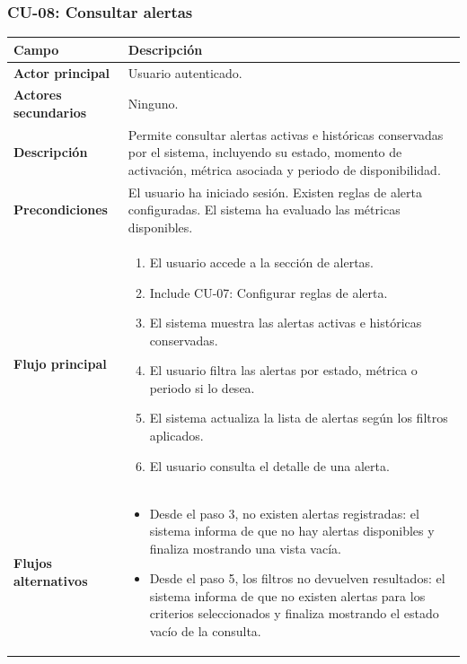 \clearpage
\subsubsection{CU-08: Consultar alertas}

{\renewcommand{\arraystretch}{1.25}\footnotesize
\begin{longtable}{p{3.2cm}p{10.2cm}}
\toprule
\textbf{Campo} & \textbf{Descripción} \\
\midrule
\textbf{Actor principal} & Usuario autenticado. \\
\textbf{Actores secundarios} & Ninguno. \\
\textbf{Descripción} & Permite consultar alertas activas e históricas conservadas por el sistema, incluyendo su estado, momento de activación, métrica asociada y periodo de disponibilidad. \\
\textbf{Precondiciones} & El usuario ha iniciado sesión. Existen reglas de alerta configuradas. El sistema ha evaluado las métricas disponibles. \\
\textbf{Flujo principal} & \begin{minipage}[t]{10.2cm}\begin{enumerate}[noitemsep,leftmargin=*]
    \item El usuario accede a la sección de alertas.
    \item Include CU-07: Configurar reglas de alerta.
    \item El sistema muestra las alertas activas e históricas conservadas.
    \item El usuario filtra las alertas por estado, métrica o periodo si lo desea.
    \item El sistema actualiza la lista de alertas según los filtros aplicados.
    \item El usuario consulta el detalle de una alerta.
\end{enumerate}\end{minipage} \\
\textbf{Flujos alternativos} & \begin{minipage}[t]{10.2cm}\begin{itemize}[noitemsep,leftmargin=*]
    \item Desde el paso 3, no existen alertas registradas: el sistema informa de que no hay alertas disponibles y finaliza mostrando una vista vacía.
    \item Desde el paso 5, los filtros no devuelven resultados: el sistema informa de que no existen alertas para los criterios seleccionados y finaliza mostrando el estado vacío de la consulta.

\end{itemize}
\end{minipage}
\end{longtable}}
